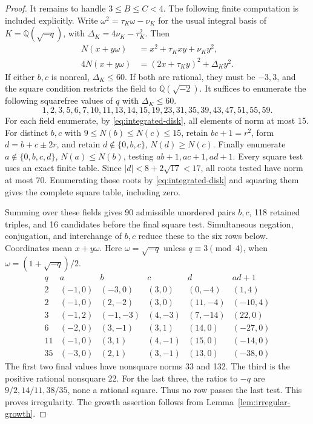 \documentclass[12pt]{article}
\numberwithin{equation}{section}
\begin{document}
\begin{proof}
It remains to handle \(3\le B\le C<4\). The following finite computation
is included explicitly. Write
\(\omega^2=\tau_K\omega-\nu_K\) for the usual integral basis of
\(K=\mathbb Q(\sqrt{-q})\), with \(\Delta_K=4\nu_K-\tau_K^2\). Then
\begin{equation}\label{eq:integrated-disk}
\begin{aligned}
 N(x+y\omega)&=x^2+\tau_Kxy+\nu_Ky^2,\\
 4N(x+y\omega)&=(2x+\tau_Ky)^2+\Delta_Ky^2.
\end{aligned}
\end{equation}
If either \(b,c\) is nonreal, \(\Delta_K\le60\). If both are rational,
they must be \(-3,3\), and the square condition restricts the field to
\(\mathbb Q(\sqrt{-2})\). It suffices to enumerate the following squarefree values of $q$ with $\Delta_K\le60$.
\[
 1,2,3,5,6,7,10,11,13,14,15,19,23,31,35,39,43,47,51,55,59.
\]
For each field enumerate, by \eqref{eq:integrated-disk}, all elements of norm at most 15.
For distinct \(b,c\) with \(9\le N(b)\le N(c)\le15\), retain
\(bc+1=r^2\), form \(d=b+c\pm2r\), and retain
\(d\notin\{0,b,c\}\), \(N(d)\ge N(c)\). Finally enumerate
\(a\notin\{0,b,c,d\}\), \(N(a)\le N(b)\), testing \(ab+1,ac+1,ad+1\).
Every square test uses an exact finite table. Since
\(|d|<8+2\sqrt{17}<17\), all roots tested have norm at most 70. Enumerating those roots by \eqref{eq:integrated-disk} and squaring
them gives the complete square table, including zero.

Summing over these fields gives 90 admissible unordered pairs \(b,c\),
118 retained triples, and 16 candidates before the final square test. Simultaneous negation,
conjugation, and interchange of \(b,c\) reduce these to the six rows below.
Coordinates mean \(x+y\omega\). Here \(\omega=\sqrt{-q}\) unless
\(q\equiv3\pmod4\), when \(\omega=(1+\sqrt{-q})/2\).
\[
\begin{array}{c|rrrrr}
q&a&b&c&d&ad+1\\\hline
2&(-1,0)&(-3,0)&(3,0)&(0,-4)&(1,4)\\
2&(-1,0)&(2,-2)&(3,0)&(11,-4)&(-10,4)\\
3&(-1,2)&(-1,-3)&(4,-3)&(7,-14)&(22,0)\\
6&(-2,0)&(3,-1)&(3,1)&(14,0)&(-27,0)\\
11&(-1,0)&(3,1)&(4,-1)&(15,0)&(-14,0)\\
35&(-3,0)&(2,1)&(3,-1)&(13,0)&(-38,0)
\end{array}
\]
The first two final values have nonsquare norms 33 and 132. The third is
the positive rational nonsquare 22. For the last three, the ratios to
\(-q\) are \(9/2,14/11,38/35\), none a rational square. Thus no row
passes the last test. This proves irregularity. The growth assertion
follows from Lemma~\ref{lem:irregular-growth}.
\end{proof}
\end{document}
